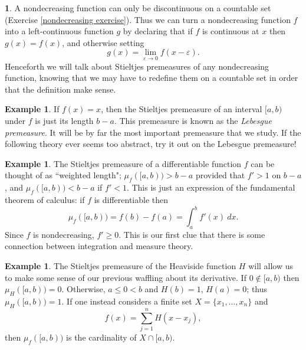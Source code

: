 \documentclass[12pt]{book}
\newcommand{\dfn}[1]{\emph{#1}\index{#1}}
\theoremstyle{definition}
\newtheorem{subsec}[theorem]{}
\newtheorem{example}[theorem]{Example}
\begin{document}
\begin{subsec}
A nondecreasing function can only be discontinuous on a countable set (Exercise \ref{nondecreasing exercise}).
Thus we can turn a nondecreasing function $f$ into a left-continuous function $g$ by declaring that if $f$ is continuous at $x$ then $g(x) = f(x)$, and otherwise setting
$$g(x) = \lim_{\varepsilon \to 0} f(x - \varepsilon).$$
Henceforth we will talk about Stieltjes premeasures of any nondecreasing function, knowing that we may have to redefine them on a countable set in order that the definition make sense.
\end{subsec}

\begin{example}
If $f(x) = x$, then the Stieltjes premeasure of an interval $[a, b)$ under $f$ is just its length $b - a$.
This premeasure is known as the \dfn{Lebesgue premeasure}.
It will be by far the most important premeasure that we study.
If the following theory ever seems too abstract, try it out on the Lebesgue premeasure!
\end{example}

\begin{example}
The Stieltjes premeasure of a differentiable function $f$ can be thought of as ``weighted length"; $\mu_f([a, b)) > b - a$ provided that $f' > 1$ on $b - a$, and $\mu_f([a, b)) < b - a$ if $f' < 1$.
This is just an expression of the fundamental theorem of calculus: if $f$ is differentiable then
$$\mu_f([a, b)) = f(b) - f(a) = \int_a^b f'(x)~dx.$$
Since $f$ is nondecreasing, $f' \geq 0$.
This is our first clue that there is some connection between integration and measure theory.
\end{example}

\begin{example}
The Stieltjes premeasure of the Heaviside function $H$ will allow us to make some sense of our previous waffling about its derivative.
If $0 \notin [a, b)$ then $\mu_H([a, b)) = 0$.
Otherwise, $a \leq 0 < b$ and $H(b) = 1$, $H(a) = 0$; thus $\mu_H([a, b)) = 1$.
If one instead considers a finite set $X = \{x_1, \dots, x_n\}$ and
$$f(x) = \sum_{j=1}^n H(x - x_j),$$
then $\mu_f([a, b))$ is the cardinality of $X \cap [a, b)$.
\end{example}
\end{document}
